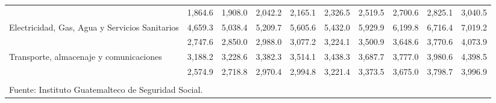 \begin{landscape}
\begin{center}
\begin{spacing}{1.2}
\begin{tabular}{p{5.5cm}ccccccccc}
				\rowcolor{color1!5!white}\multicolumn{1}{p{5.5cm}}{	Construcción	}&	 1,864.6 	 & 	 1,908.0 	 & 	 2,042.2 	 & 	 2,165.1 	 & 	 2,326.5 	 & 	 2,519.5 	 & 	 2,700.6 	 & 	 2,825.1 	 & 	 3,040.5 	 \\ 
				\multicolumn{1}{p{5.5cm}}{	Electricidad, Gas, Agua y Servicios Sanitarios	}&	 4,659.3 	 & 	 5,038.4 	 & 	 5,209.7 	 & 	 5,605.6 	 & 	 5,432.0 	 & 	 5,929.9 	 & 	 6,199.8 	 & 	 6,716.4 	 & 	 7,019.2 	 \\ 
				\rowcolor{color1!5!white}\multicolumn{1}{p{5.5cm}}{	Comercio	}&	 2,747.6 	 & 	 2,850.0 	 & 	 2,988.0 	 & 	 3,077.2 	 & 	 3,224.1 	 & 	 3,500.9 	 & 	 3,648.6 	 & 	 3,770.6 	 & 	 4,073.9 	 \\ 
				\multicolumn{1}{p{5.5cm}}{	Transporte, almacenaje y comunicaciones	}&	 3,188.2 	 & 	 3,228.6 	 & 	 3,382.3 	 & 	 3,514.1 	 & 	 3,438.3 	 & 	 3,687.7 	 & 	 3,777.0 	 & 	 3,980.6 	 & 	 4,398.5 	 \\ 
				\rowcolor{color1!5!white}\multicolumn{1}{p{5.5cm}}{	Servicios	}&	 2,574.9 	 & 	 2,718.8 	 & 	 2,970.4 	 & 	 2,994.8 	 & 	 3,221.4 	 & 	 3,373.5 	 & 	 3,675.0 	 & 	 3,798.7 	 & 	 3,996.9 	 \\ 
				\hline
				&&&&&&&&&\\[-0.36cm]
				\multicolumn{10}{l}{\footnotesize Fuente: Instituto Guatemalteco de Seguridad Social.}\\
			\end{tabular}\addtocounter{Cuadro}{1}
		\end{spacing}
	\end{center}
\end{landscape}








